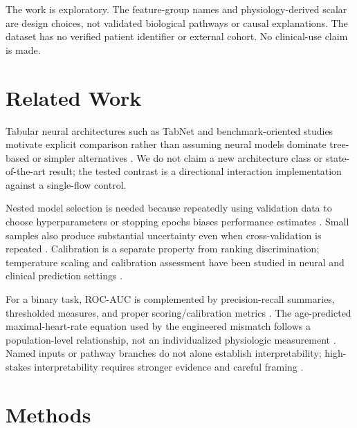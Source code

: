\documentclass[10pt,twocolumn]{article}
\begin{document}
The work is exploratory. The feature-group names and physiology-derived scalar are design choices, not validated biological pathways or causal explanations. The dataset has no verified patient identifier or external cohort. No clinical-use claim is made.

\begin{table}[t]
\centering
\scriptsize
\caption{Dataset and preprocessing audit}
\resizebox{\textwidth}{!}{}
\label{tab:table01_dataset}
\end{table}

\section{Related Work}

Tabular neural architectures such as TabNet and benchmark-oriented studies motivate explicit comparison rather than assuming neural models dominate tree-based or simpler alternatives \cite{Arik2021} \cite{Gorishniy2021} \cite{Grinsztajn2022}. We do not claim a new architecture class or state-of-the-art result; the tested contrast is a directional interaction implementation against a single-flow control.

Nested model selection is needed because repeatedly using validation data to choose hyperparameters or stopping epochs biases performance estimates \cite{Cawley2010} \cite{Varma2006}. Small samples also produce substantial uncertainty even when cross-validation is repeated \cite{Varoquaux2018}. Calibration is a separate property from ranking discrimination; temperature scaling and calibration assessment have been studied in neural and clinical prediction settings \cite{Guo2017} \cite{VanCalster2019}.

For a binary task, ROC-AUC is complemented by precision-recall summaries, thresholded measures, and proper scoring/calibration metrics \cite{Saito2015}. The age-predicted maximal-heart-rate equation used by the engineered mismatch follows a population-level relationship, not an individualized physiologic measurement \cite{Tanaka2001}. Named inputs or pathway branches do not alone establish interpretability; high-stakes interpretability requires stronger evidence and careful framing \cite{Rudin2019}.

\section{Methods}
\end{document}
